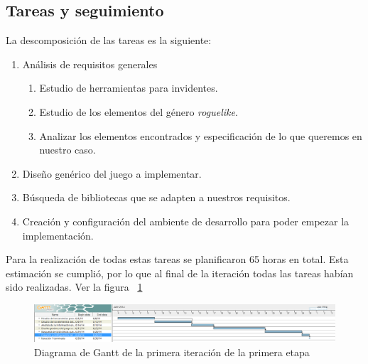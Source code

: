 \subsection{Tareas y seguimiento}

La descomposición de las tareas es la siguiente:

\begin{enumerate}[label=\bfseries WBS 1.\arabic*]
  \item Análisis de requisitos generales
    \begin{enumerate}[label=\bfseries WBS 1.1.\arabic*]
      \item Estudio de herramientas para invidentes.
      \item Estudio de los elementos del género \textit{roguelike}.
      \item Analizar los elementos encontrados y especificación de lo que queremos en nuestro caso.
    \end{enumerate}
  \item Diseño genérico del juego a implementar.
  \item Búsqueda de bibliotecas que se adapten a nuestros requisitos.
  \item Creación y configuración del ambiente de desarrollo para poder empezar la implementación.
\end{enumerate}

Para la realización de todas estas tareas se planificaron 65 horas en total. Esta estimación se cumplió, por lo que al final de la iteración todas las tareas habían sido realizadas. Ver la figura ~\ref{fig:sec1it1}

\begin{figure}
    \includegraphics[width=\textwidth,height=\textheight,keepaspectratio]{./img/sec1it1.png}
  \caption{Diagrama de Gantt de la primera iteración de la primera etapa}
  \label{fig:sec1it1}
\end{figure}